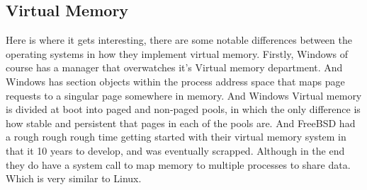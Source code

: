 \documentclass{article}
\begin{document}
\subsection{Virtual Memory}
		Here is where it gets interesting, there are some notable differences between the operating systems in how they implement virtual memory. Firstly, Windows of course has a manager that overwatches it’s Virtual memory department. And Windows has section objects within the process address space that maps page requests to a singular page somewhere in memory. And Windows Virtual memory is divided at boot into paged and non-paged pools, in which the only difference is how stable and persistent that pages in each of the pools are. And FreeBSD had a rough rough rough time getting started with their virtual memory system in that it 10 years to develop, and was eventually scrapped. Although in the end they do have a system call to map memory to multiple processes to share data. Which is very similar to Linux.
\end{document}
